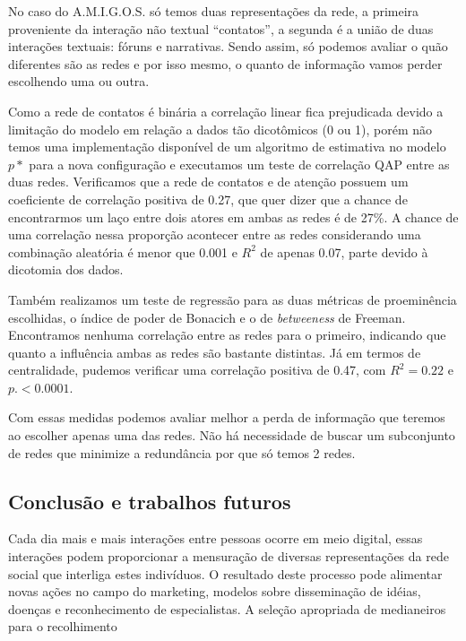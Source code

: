 \documentclass{article}
\begin{document}
\begin{table}[htbp]
	\begin{boxedminipage}{\textwidth}
	No caso do A.M.I.G.O.S. só temos duas representações da rede, a primeira 
	proveniente da interação não textual ``contatos'', a segunda é a união de duas
	interações textuais: fóruns e narrativas. Sendo assim, só podemos avaliar o
	quão diferentes são as redes e por isso mesmo, o quanto de informação vamos
	perder escolhendo uma ou outra.
	
	Como a rede de contatos é binária a correlação linear fica prejudicada devido a
	limitação do modelo em relação a dados tão dicotômicos (0 ou 1), porém não
	temos uma implementação disponível de um algoritmo de estimativa no modelo $p*$
	para a nova configuração e executamos um teste de correlação QAP entre as duas
	redes. Verificamos que a rede de contatos e de atenção possuem um coeficiente
	de correlação positiva de 0.27, que quer dizer que a chance de encontrarmos um
	laço entre dois atores em ambas as redes é de 27\%. A chance de uma correlação
	nessa proporção acontecer entre as redes considerando uma combinação aleatória
	é menor que 0.001 e $R^2$ de apenas 0.07, parte devido à dicotomia dos dados.
	
	Também realizamos um teste de regressão para as duas métricas de proeminência
	escolhidas, o índice de poder de Bonacich e o de \textit{betweeness} de
	Freeman. Encontramos nenhuma correlação entre as redes para o primeiro,
	indicando que quanto a influência ambas as redes são bastante distintas. Já em
	termos de centralidade, pudemos verificar uma correlação positiva de 0.47, com
	$R^2=0.22$ e $p. < 0.0001$.
	
	Com essas medidas podemos avaliar melhor a perda de informação que teremos ao
	escolher apenas uma das redes. Não há necessidade de buscar um subconjunto de
	redes que minimize a redundância por que só temos 2 redes.
	
	\end{boxedminipage}
\end{table}

\subsection{Conclusão e trabalhos futuros}

Cada dia mais e mais interações entre pessoas ocorre em meio digital, essas
interações podem proporcionar a mensuração de diversas representações da rede
social que interliga estes indivíduos. O resultado deste processo pode alimentar
novas ações no campo do marketing, modelos sobre disseminação de idéias,
doenças e reconhecimento de especialistas. A seleção apropriada de medianeiros
para o recolhimento 
\end{document}

